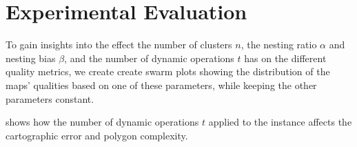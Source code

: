 \section{Experimental Evaluation}
\label{sect:experimental-evaluation}

To gain insights into the effect the number of clusters $n$, the nesting ratio $\alpha$ and nesting bias $\beta$, and the number of dynamic operations $t$ has on the different quality metrics, we create create swarm plots showing the distribution of the maps' qualities based on one of these parameters, while keeping the other parameters constant.

 shows how the number of dynamic operations $t$ applied to the instance affects the cartographic error and polygon complexity.

